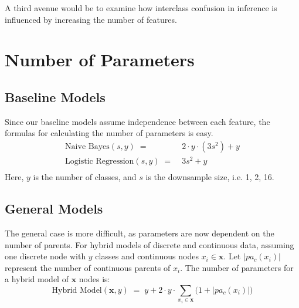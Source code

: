 \documentclass{article}
\begin{document}
A third avenue would be to examine how interclass confusion in inference
is influenced by increasing the number of features.









\appendix
\section{Number of Parameters}
\subsection{Baseline Models}
Since our baseline models assume independence between each feature, the formulas
for calculating the number of parameters is easy.
\begin{equation}
  \begin{aligned}
    \text{Naive Bayes}(s, y) \; = & \; 2 \cdot y \cdot (3 s^2) + y \\
    \text{Logistic Regression}(s, y) \; = & \; 3 s^2 + y \\
  \end{aligned}
\end{equation}
Here, $y$ is the number of classes, and $s$ is the downsample size, i.e. 1, 2, 16.
\subsection{General Models}
The general case is more difficult, as parameters are now dependent on the number
of parents. For hybrid models of discrete and continuous data, assuming one
discrete node with $y$ classes and continuous nodes $x_i \in \mathbf{x}$. Let
$|pa_c(x_i)|$ represent the number of continuous parents of $x_i$. The number of
parameters for a hybrid model of $\mathbf{x}$ nodes is:
\begin{equation}
  \text{Hybrid Model}(\mathbf{x}, y) \; = \; y + 2 \cdot y \cdot \sum_{x_i \in \mathbf{x}} \big( 1 + |pa_c (x_i)| \big)
\end{equation}
\end{document}
